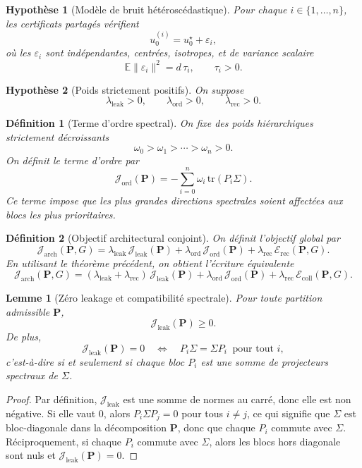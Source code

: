 \documentclass[11pt,a4paper]{article}
\newtheorem{definition}{Définition}[section]
\newtheorem{assumption}{Hypothèse}[section]
\newtheorem{lemma}{Lemme}[section]
\newcommand{\1}{\mathbf 1}
\begin{document}
\begin{assumption}[Modèle de bruit hétéroscédastique]
Pour chaque \(i\in\{1,\dots,n\}\), les certificats partagés vérifient
\[
u_0^{(i)}=u_0^\star+\varepsilon_i,
\]
où les \(\varepsilon_i\) sont indépendantes, centrées, isotropes, et de variance scalaire
\[
\mathbb E\|\varepsilon_i\|^2=d\,\tau_i,
\qquad \tau_i>0.
\]
\end{assumption}

\begin{assumption}[Poids strictement positifs]
On suppose
\[
\lambda_{\mathrm{leak}}>0,
\qquad
\lambda_{\mathrm{ord}}>0,
\qquad
\lambda_{\mathrm{rec}}>0.
\]
\end{assumption}

\begin{definition}[Terme d'ordre spectral]
On fixe des poids hiérarchiques strictement décroissants
\[
\omega_0>\omega_1>\cdots>\omega_n>0.
\]
On définit le terme d'ordre par
\[
\mathcal J_{\mathrm{ord}}(\mathbf P)
=
-\sum_{i=0}^n \omega_i\,\mathrm{tr}(P_i\Sigma).
\]
Ce terme impose que les plus grandes directions spectrales soient affectées aux blocs les plus prioritaires.
\end{definition}

\begin{definition}[Objectif architectural conjoint]
On définit l'objectif global par
\[
\mathcal J_{\mathrm{arch}}(\mathbf P,G)
=
\lambda_{\mathrm{leak}}\,\mathcal J_{\mathrm{leak}}(\mathbf P)
+
\lambda_{\mathrm{ord}}\,\mathcal J_{\mathrm{ord}}(\mathbf P)
+
\lambda_{\mathrm{rec}}\,\mathcal E_{\mathrm{rec}}(\mathbf P,G).
\]
En utilisant le théorème précédent, on obtient l'écriture équivalente
\[
\mathcal J_{\mathrm{arch}}(\mathbf P,G)
=
(\lambda_{\mathrm{leak}}+\lambda_{\mathrm{rec}})\,
\mathcal J_{\mathrm{leak}}(\mathbf P)
+
\lambda_{\mathrm{ord}}\,\mathcal J_{\mathrm{ord}}(\mathbf P)
+
\lambda_{\mathrm{rec}}\,\mathcal E_{\mathrm{coll}}(\mathbf P,G).
\]
\end{definition}

\begin{lemma}[Zéro leakage et compatibilité spectrale]
Pour toute partition admissible \(\mathbf P\),
\[
\mathcal J_{\mathrm{leak}}(\mathbf P)\ge 0.
\]
De plus,
\[
\mathcal J_{\mathrm{leak}}(\mathbf P)=0
\quad\Longleftrightarrow\quad
P_i\Sigma=\Sigma P_i
\ \text{ pour tout } i,
\]
c'est-à-dire si et seulement si chaque bloc \(P_i\) est une somme de projecteurs spectraux de \(\Sigma\).
\end{lemma}

\begin{proof}
Par définition, \(\mathcal J_{\mathrm{leak}}\) est une somme de normes au carré, donc elle est non négative.
Si elle vaut \(0\), alors \(P_i\Sigma P_j=0\) pour tous \(i\neq j\), ce qui signifie que \(\Sigma\) est bloc-diagonale dans la décomposition \(\mathbf P\), donc que chaque \(P_i\) commute avec \(\Sigma\).
Réciproquement, si chaque \(P_i\) commute avec \(\Sigma\), alors les blocs hors diagonale sont nuls et \(\mathcal J_{\mathrm{leak}}(\mathbf P)=0\).
\end{proof}
\end{document}
